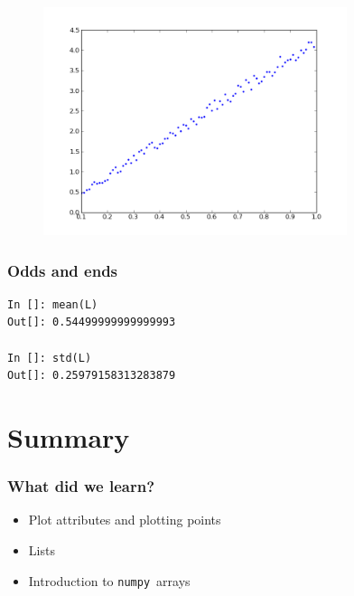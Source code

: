 \documentclass[14pt,compress]{beamer}
\newcounter{time}
\newcommand{\inctime}[1]{\addtocounter{time}{#1}{\tiny \thetime\ m}}
\newcommand{\num}{\texttt{numpy}}
\begin{document}
\begin{frame}[fragile]
\begin{figure}
\includegraphics[width=3.5in]{data/L-Tsq.png}
\end{figure}
\end{frame}

\begin{frame}[fragile]
\frametitle{Odds and ends}
\begin{lstlisting}
In []: mean(L)
Out[]: 0.54499999999999993

In []: std(L)
Out[]: 0.25979158313283879
\end{lstlisting}
\end{frame}

\section {Summary}
\begin{frame}[fragile]
\frametitle{What did we learn?}
\begin{itemize}
  \item Plot attributes and plotting points
  \item Lists
  \item Introduction to \num\ arrays
\end{itemize}

\inctime{10}
\end{frame}
\end{document}
